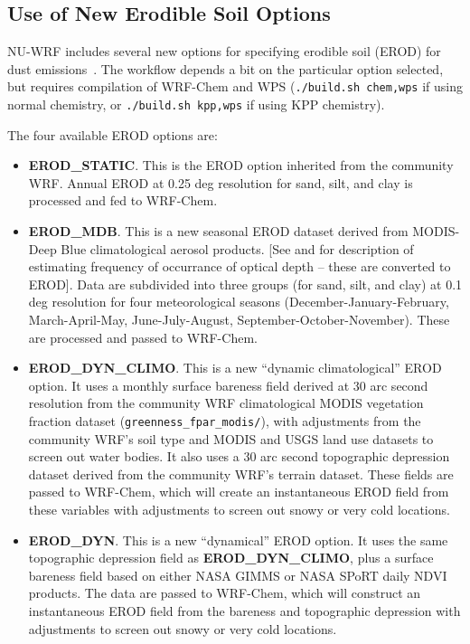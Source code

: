 \subsection{Use of New Erodible Soil Options}
\label{subsec:ErodWorkflow}

NU-WRF includes several new options for specifying erodible soil (EROD) for
dust emissions~\citep{ref:ErodUserGuide}. The workflow depends a bit on the 
particular option selected, but requires compilation of WRF-Chem and WPS 
(\texttt{./build.sh chem,wps} if using normal chemistry, or 
\texttt{./build.sh kpp,wps} if using KPP chemistry).

The four available EROD options are:
\begin{itemize}
\item \textbf{EROD\_STATIC}. This is the EROD option inherited from the 
community WRF. Annual EROD at 0.25 deg resolution for sand, silt, and clay is 
processed and fed to WRF-Chem.
\item \textbf{EROD\_MDB}. This is a new seasonal EROD dataset derived from
MODIS-Deep Blue climatological aerosol products. [See 
\cite{ref:GinouxEtAl2012} and \cite{ref:GinouxEtAl2010} for description of
estimating frequency of occurrance of optical depth -- these are converted
to EROD]. Data are subdivided into three groups (for sand, silt, and clay) at 
0.1 deg resolution for four meteorological seasons (December-January-February,
March-April-May, June-July-August, September-October-November). These are 
processed and passed to WRF-Chem. 
\item \textbf{EROD\_DYN\_CLIMO}. This is a new ``dynamic climatological'' EROD
option. It uses a monthly surface bareness field derived at 30 arc second
resolution from the community WRF climatological MODIS vegetation fraction
dataset (\texttt{greenness\_fpar\_modis/}), with adjustments from the 
community WRF's soil type and MODIS and USGS land use datasets to screen out 
water bodies. It also uses a 30 arc second topographic depression dataset 
derived from the community WRF's terrain dataset. These fields are passed to 
WRF-Chem, which will create an instantaneous EROD field from these variables 
with adjustments to screen out snowy or very cold locations.
\item \textbf{EROD\_DYN}. This is a new ``dynamical'' EROD option. It uses
the same topographic depression field as \textbf{EROD\_DYN\_CLIMO}, plus
a surface bareness field based on either NASA GIMMS or NASA SPoRT daily NDVI
products.  The data are passed to WRF-Chem, which will construct an 
instantaneous EROD field from the bareness and topographic depression with 
adjustments to screen out snowy or very cold locations. 
\end{itemize}

